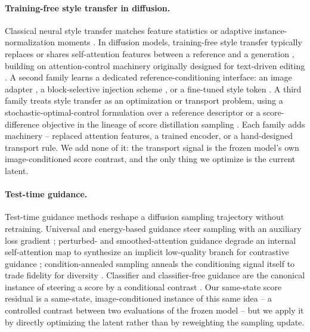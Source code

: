 \documentclass[letterpaper]{article} %
\begin{document}
\paragraph{Training-free style transfer in diffusion.}
Classical neural style transfer matches feature statistics or adaptive
instance-normalization moments \cite{gatys2016style,huang2017adain}. In
diffusion models, training-free style transfer typically replaces or shares
self-attention features between a reference and a generation
\cite{hertz2024stylealigned,chung2024styleinjection}, building on
attention-control machinery originally designed for text-driven editing
\cite{hertz2023prompt,tumanyan2023plugplay,yang2023paint}. A second family
learns a dedicated reference-conditioning interface: an image adapter
\cite{ye2023ipadapter}, a block-selective injection scheme
\cite{wang2024instantstyle}, or a fine-tuned style token
\cite{sohn2023styledrop}. A third family treats style transfer as an
optimization or transport problem, using a stochastic-optimal-control
formulation over a reference descriptor \cite{rout2025rbmodulation} or a
score-difference objective in the lineage of score distillation sampling
\cite{poole2023dreamfusion,hertz2023dds,nam2024cds}. Each family adds
machinery -- replaced attention features, a trained encoder, or a
hand-designed transport rule. We add none of it: the transport signal is the
frozen model's own image-conditioned score contrast, and the only thing we
optimize is the current latent.

\paragraph{Test-time guidance.}
Test-time guidance methods reshape a diffusion sampling trajectory without
retraining. Universal and energy-based guidance steer sampling with an
auxiliary loss gradient \cite{bansal2023universal}; perturbed- and
smoothed-attention guidance degrade an internal self-attention map to
synthesize an implicit low-quality branch for contrastive guidance
\cite{ahn2024pag,hong2024seg}; condition-annealed sampling anneals the
conditioning signal itself to trade fidelity for diversity
\cite{sadat2024cads}. Classifier and classifier-free guidance are the
canonical instance of steering a score by a conditional contrast
\cite{dhariwal2021diffusion,ho2022cfg}. Our same-state score residual is a
same-state, image-conditioned instance of this same idea -- a controlled
contrast between two evaluations of the frozen model -- but we apply it by
directly optimizing the latent rather than by reweighting the sampling update.
\end{document}
